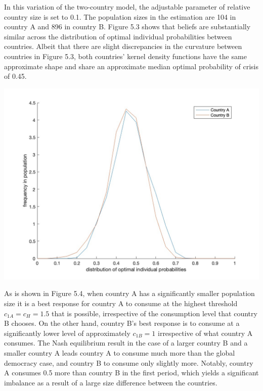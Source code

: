 \documentclass[11pt,preprint, authoryear]{elsarticle}
\let\origfigure\figure
\let\endorigfigure\endfigure
\renewenvironment{figure}[1][2] {
    \expandafter\origfigure\expandafter[H]
} {
    \endorigfigure
}
\numberwithin{equation}{section}
\numberwithin{figure}{section}
\numberwithin{table}{section}
\begin{document}
In this variation of the two-country model, the adjustable parameter of
relative country size is set to 0.1. The population sizes in the
estimation are 104 in country A and 896 in country B. Figure 5.3 shows
that beliefs are substantially similar across the distribution of
optimal individual probabilities between countries. Albeit that there
are slight discrepancies in the curvature between countries in Figure
5.3, both countries' kernel density functions have the same approximate
shape and share an approximate median optimal probability of crisis of
0.45.

\begin{figure}[H]

{\centering \includegraphics[width=0.75\linewidth]{images/Fig4_0.1Size0Bias} 

}

\caption{Asymmetric country size model: Kernel density function of the distribution of the optimal probabilty of crisis and frequency thereof across individuals in country A and country B}\label{fig:Fig 5.3}
\end{figure}

As is shown in Figure 5.4, when country A has a significantly smaller
population size it is a best response for country A to consume at the
highest threshold \(c_{1A}=c_H=1.5\) that is possible, irrespective of
the consumption level that country B chooses. On the other hand, country
B's best response is to consume at a significantly lower level of
approximately \(c_{1B}=1\) irrespective of what country A consumes. The
Nash equilibrium result in the case of a larger country B and a smaller
country A leads country A to consume much more than the global democracy
case, and country B to consume only slightly more. Notably, country A
consumes 0.5 more than country B in the first period, which yields a
significant imbalance as a result of a large size difference between the
countries.
\end{document}

